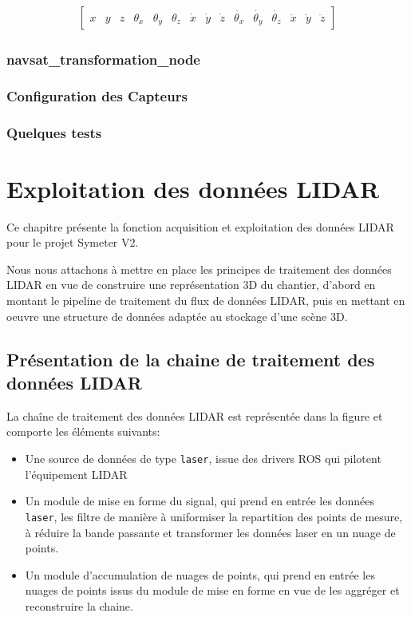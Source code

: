 \documentclass[12pt,a4paper]{report}
\begin{document}
	\begin{gather}
		\begin{bmatrix}
			x&y&z&\theta_x&\theta_y&\theta_z&
			\dot{x}&\dot{y}&\dot{z}&\dot{\theta_x}&\dot{\theta_y}&\dot{\theta_z} &\ddot{x}&\ddot{y}&\ddot{z}
		\end{bmatrix}
	\end{gather}
	
	\subsection{navsat\_transformation\_node}
	
	\subsection{Configuration des Capteurs}
	
	\subsection{Quelques tests}
	
	
\chapter{Exploitation des données LIDAR}

Ce chapitre présente la fonction acquisition et exploitation des données LIDAR pour le projet Symeter V2. 

\para Nous nous attachons à mettre en place les principes de traitement des données LIDAR en vue de construire une représentation 3D du chantier, d'abord en montant le pipeline de traitement du flux de données LIDAR, puis en mettant en oeuvre une structure de données adaptée au stockage d'une scène 3D.

	\section{Présentation de la chaine de traitement des données LIDAR}
	
	La chaîne de traitement des données LIDAR est représentée dans la figure  et comporte les éléments suivants:
	\begin{itemize}
		\item Une source de données de type \verb|laser|, issue des drivers ROS qui pilotent l'équipement LIDAR
		
		\item Un module de mise en forme du signal, qui prend en entrée les données \verb|laser|, les filtre de manière à uniformiser la repartition des points de mesure, à réduire la bande passante et transformer les données laser en un nuage de points.
		
		\item Un module d'accumulation de nuages de points, qui prend en entrée les nuages de points issus du module de mise en forme en vue de les aggréger et reconstruire la chaine.
	\end{itemize}
	
\end{document}
